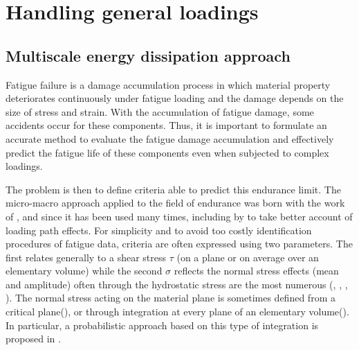 \chapter{Handling general loadings}\label{chp:5}
\minitoc

\section{Multiscale energy dissipation approach}
\label{sec:5.1}
Fatigue failure is a damage accumulation process in which material property deteriorates continuously under fatigue loading and the damage depends on the size of stress and strain. With the accumulation of fatigue damage, some accidents occur for these components. Thus, it is important to formulate an accurate method to evaluate the fatigue damage accumulation and effectively predict the fatigue life of these components even when subjected to complex loadings.

The problem is then to define criteria able to predict this endurance limit. The micro-macro approach applied to the field of endurance was born with the work of \cite{van1973khmu}, and since it has been used many times, including by \cite{papadopoulos2001long} to take better account of loading path effects. For simplicity and to avoid too costly identification procedures of fatigue data, criteria are often expressed using two parameters. The first relates generally to a shear stress $\tau$ (on a plane or on average over an elementary volume) while the second $\sigma$ reflects the normal stress effects (mean and amplitude) often through the hydrostatic stress are the most numerous (\cite{crossland1956effect}, \cite{sines1959behavior}, \cite{FFE:FFE452}, \cite{thu2008effet}).  The normal stress acting on the material plane is sometimes defined from a critical plane(\cite{findley1959}), or through integration at every plane of an elementary volume(\cite{liu1993berechnung}).  In particular, a probabilistic approach based on this type of integration is proposed in \cite{thu2008effet} .

